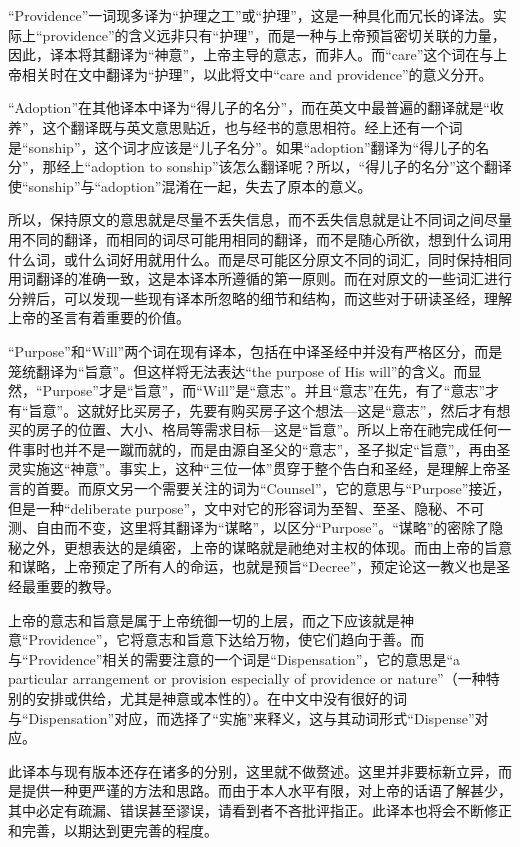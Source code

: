 \documentclass[12pt, a4paper, oneside]{ctexart}
\begin{document}
“Providence”一词现多译为“护理之工”或“护理”，这是一种具化而冗长的译法。实际上“providence”的含义远非只有“护理”，而是一种与上帝预旨密切关联的力量，因此，译本将其翻译为“神意”，上帝主导的意志，而非人。而“care”这个词在与上帝相关时在文中翻译为“护理”，以此将文中“care and providence”的意义分开。

“Adoption”在其他译本中译为“得儿子的名分”，而在英文中最普遍的翻译就是“收养”，这个翻译既与英文意思贴近，也与经书的意思相符。经上还有一个词是“sonship”，这个词才应该是“儿子名分”。如果“adoption”翻译为“得儿子的名分”，那经上“adoption to sonship”该怎么翻译呢？所以，“得儿子的名分”这个翻译使“sonship”与“adoption”混淆在一起，失去了原本的意义。

所以，保持原文的意思就是尽量不丢失信息，而不丢失信息就是让不同词之间尽量用不同的翻译，而相同的词尽可能用相同的翻译，而不是随心所欲，想到什么词用什么词，或什么词好用就用什么。而是尽可能区分原文不同的词汇，同时保持相同用词翻译的准确一致，这是本译本所遵循的第一原则。而在对原文的一些词汇进行分辨后，可以发现一些现有译本所忽略的细节和结构，而这些对于研读圣经，理解上帝的圣言有着重要的价值。

“Purpose”和“Will”两个词在现有译本，包括在中译圣经中并没有严格区分，而是笼统翻译为“旨意”。但这样将无法表达“the purpose of His will”的含义。而显然，“Purpose”才是“旨意”，而“Will”是“意志”。并且“意志”在先，有了“意志”才有“旨意”。这就好比买房子，先要有购买房子这个想法---这是“意志”，然后才有想买的房子的位置、大小、格局等需求目标---这是“旨意”。所以上帝在祂完成任何一件事时也并不是一蹴而就的，而是由源自圣父的“意志”，圣子拟定“旨意”，再由圣灵实施这“神意”。事实上，这种“三位一体”贯穿于整个告白和圣经，是理解上帝圣言的首要。而原文另一个需要关注的词为“Counsel”，它的意思与“Purpose”接近，但是一种“deliberate purpose”，文中对它的形容词为至智、至圣、隐秘、不可测、自由而不变，这里将其翻译为“谋略”，以区分“Purpose”。“谋略”的密除了隐秘之外，更想表达的是缜密，上帝的谋略就是祂绝对主权的体现。而由上帝的旨意和谋略，上帝预定了所有人的命运，也就是预旨“Decree”，预定论这一教义也是圣经最重要的教导。

上帝的意志和旨意是属于上帝统御一切的上层，而之下应该就是神意“Providence”，它将意志和旨意下达给万物，使它们趋向于善。而与“Providence”相关的需要注意的一个词是“Dispensation”，它的意思是“a particular arrangement or provision especially of providence or nature”（一种特别的安排或供给，尤其是神意或本性的）。在中文中没有很好的词与“Dispensation”对应，而选择了“实施”来释义，这与其动词形式“Dispense”对应。

此译本与现有版本还存在诸多的分别，这里就不做赘述。这里并非要标新立异，而是提供一种更严谨的方法和思路。而由于本人水平有限，对上帝的话语了解甚少，其中必定有疏漏、错误甚至谬误，请看到者不吝批评指正。此译本也将会不断修正和完善，以期达到更完善的程度。
\end{document}
